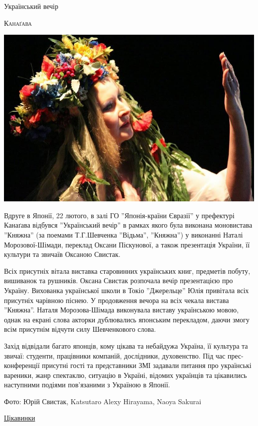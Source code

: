 \documentclass[10pt,a4paper]{article}
\newcommand{\Category}[1]{%
		\begin{center}	
			\Large \usefont{T2A}{kurier}{m}{n}
			\underline{#1}%
		\end{center}	
		\par \normalsize \normalfont}
\newcommand{\NewsItem}[1]{%
		\usefont{T2A}{iwona}{m}{n} 
		\large #1 \vspace{4pt}
		\par \normalsize \normalfont}
\newcommand{\NewsAuthor}[1]{%
			\hfill \textsc{#1} \vspace{4pt}
			\par \normalfont}
\begin{document}
\begin{multicols}{3}
\vspace{1cm}
\NewsItem{Український вечір}
\NewsAuthor{Канаґава}
		\begin{center}
			\includegraphics[width=0.8\linewidth]{images/ukr-evening}
		\end{center}
Вдруге в Японії, 22 лютого, в залі ГО ''Японія-країни Євразії'' у префектурі Канаґава відбувся ''Український вечір'' в рамках якого була виконана моновистава ''Княжна'' (за поемами Т.Г.Шевченка ''Відьма'', ''Княжна'') у виконанні Наталі Морозової-Шімади, переклад Оксани Піскунової, а також презентація України, її культури та звичаїв Оксаною Свистак.

Всіх присутніх вітала виставка старовинних українських книг, предметів побуту, вишиванок та рушників. Оксана Свистак розпочала вечір презентацією про Україну. Вихованка української школи в Токіо ''Джерельце'' Юлія привітала всіх присутніх чарівною піснею. У продовження вечора на всіх чекала вистава ''Княжна''. Наталя Морозова-Шімада виконувала виставу українською мовою, однак на екрані слова акторки дублювались японським перекладом, даючи змогу всім присутнім відчути силу Шевченкового слова.

Захід відвідали багато японців, кому цікава та небайдужа Україна, її культура та звичаї: студенти, працівники компаній, дослідники, духовенство. Під час прес-конференції присутні гості та представники ЗМІ задавали питання про українські вареники, жанр спектаклю, ситуацію в Україні, відомих українців та цікавились наступними подіями пов'язаними з Україною в Японії.

Фото: Юрій Свистак, Katsutaro Alexy Hirayama, Naoya Sakurai
\end{multicols}

\newpage

\Category{Цікавинки}
\end{document}
